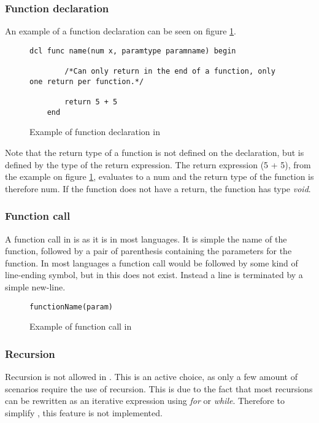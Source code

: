 \subsubsection{Function declaration}
An example of a function declaration can be seen on figure \ref{fig:funcdcl}.

\begin{figure}[H]
    \centering
    \begin{lstlisting}[style=gglang]
    dcl func name(num x, paramtype paramname) begin

        /*Can only return in the end of a function, only one return per function.*/

        return 5 + 5
    end
    \end{lstlisting}
    \caption{Example of function declaration in \lang{}}\label{fig:funcdcl}
\end{figure}

Note that the return type of a function is not defined on the declaration, but is defined by the type of the return expression. The return expression (5 + 5), from the example on figure \ref{fig:funcdcl}, evaluates to a num and the return type of the function is therefore num. If the function does not have a return, the function has type \textit{void}.

\subsubsection{Function call}
A function call in \lang{} is as it is in most languages. It is simple the name of the function, followed by a pair of parenthesis containing the parameters for the function. In most languages a function call would be followed by some kind of line-ending symbol, but in \lang{} this does not exist. Instead a line is terminated by a simple new-line. 

\begin{figure}[H]
    \centering
    \begin{lstlisting}[style=gglang]
    functionName(param)
    \end{lstlisting}
    \caption{Example of function call in \lang{}}\label{fig:funccall}
\end{figure}

\subsubsection{Recursion}
Recursion is not allowed in \lang{}. This is an active choice, as only a few amount of scenarios require the use of recursion. This is due to the fact that most recursions can be rewritten as an iterative expression using \textit{for} or \textit{while}. Therefore to simplify \lang{}, this feature is not implemented.

